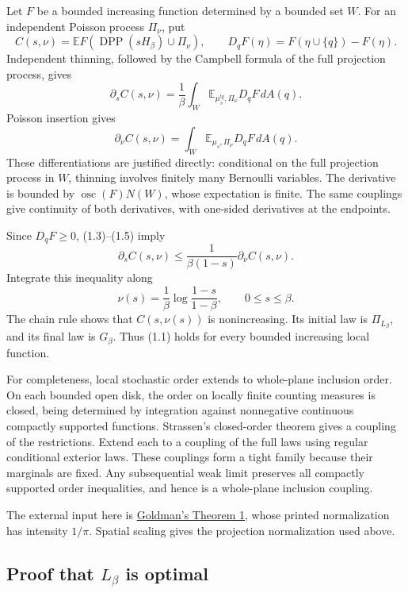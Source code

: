 \documentclass[11pt,a4paper]{article}
\theoremstyle{definition}
\theoremstyle{remark}
\numberwithin{equation}{section}
\begin{document}
Let \(F\) be a bounded increasing function determined by a bounded set \(W\). For an independent Poisson process \(\Pi_\nu\), put \[
C(s,\nu)=\mathbb EF(\operatorname{DPP}(sH_\beta)\cup\Pi_\nu),
\qquad D_qF(\eta)=F(\eta\cup\{q\})-F(\eta).
\] Independent thinning, followed by the Campbell formula of the full projection process, gives \[
\partial_s C(s,\nu)
 =\frac1\beta\int_W
      \mathbb E_{\mu_s^{!q},\Pi_\nu}D_qF\,dA(q).
\tag{1.4}
\] Poisson insertion gives \[
\partial_\nu C(s,\nu)
 =\int_W\mathbb E_{\mu_s,\Pi_\nu}D_qF\,dA(q).
\tag{1.5}
\] These differentiations are justified directly: conditional on the full projection process in \(W\), thinning involves finitely many Bernoulli variables. The derivative is bounded by \(\operatorname{osc}(F)N(W)\), whose expectation is finite. The same couplings give continuity of both derivatives, with one-sided derivatives at the endpoints.

Since \(D_qF\ge0\), (1.3)--(1.5) imply \[
\partial_s C(s,\nu)
\le\frac1{\beta(1-s)}\partial_\nu C(s,\nu).
\tag{1.6}
\] Integrate this inequality along \[
\nu(s)=\frac1\beta\log\frac{1-s}{1-\beta},
\qquad 0\le s\le\beta.
\] The chain rule shows that \(C(s,\nu(s))\) is nonincreasing. Its initial law is \(\Pi_{L_\beta}\), and its final law is \(G_\beta\). Thus (1.1) holds for every bounded increasing local function.

For completeness, local stochastic order extends to whole-plane inclusion order. On each bounded open disk, the order on locally finite counting measures is closed, being determined by integration against nonnegative continuous compactly supported functions. Strassen's closed-order theorem gives a coupling of the restrictions. Extend each to a coupling of the full laws using regular conditional exterior laws. These couplings form a tight family because their marginals are fixed. Any subsequential weak limit preserves all compactly supported order inequalities, and hence is a whole-plane inclusion coupling.

The external input here is \href{https://arxiv.org/pdf/math/0610243}{Goldman's Theorem 1}, whose printed normalization has intensity \(1/\pi\). Spatial scaling gives the projection normalization used above.

\hypertarget{proof-that-l_beta-is-optimal}{%
\subsection{\texorpdfstring{Proof that \(L_\beta\) is optimal}{Proof that L\_\textbackslash beta is optimal}}\label{proof-that-l_beta-is-optimal}}
\end{document}
